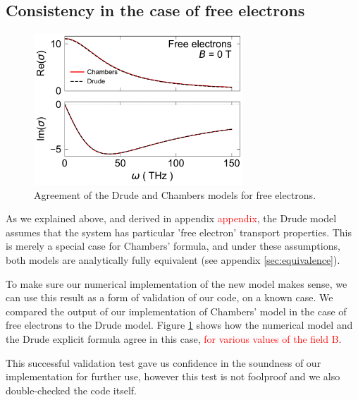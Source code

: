 \subsection{Consistency in the case of free electrons}
\begin{figure}
    \centering
    \includegraphics[width=0.7\textwidth]{figures/free_electrons}
    \caption{Agreement of the Drude and Chambers models for free electrons.}
    \label{fig:free_electrons}
\end{figure}

As we explained above, and derived in appendix \textcolor{red}{appendix}, 
the Drude model assumes that the system has particular 'free electron' transport properties. 
This is merely a special case for Chambers' formula, 
and under these assumptions, 
both models are analytically fully equivalent (see appendix \ref{sec:equivalence}).

To make sure our numerical implementation of the new model makes sense, 
we can use this result as a form of validation of our code, on a known case. 
We compared the output of our implementation of Chambers' model in the case of free electrons to the Drude model. 
Figure \ref{fig:free_electrons} shows how the numerical model and the Drude explicit formula agree in this case, \textcolor{red}{for various values of the field B}.

This successful validation test gave us confidence in the soundness of our implementation for further use, 
however this test is not foolproof and we also double-checked the code itself.
